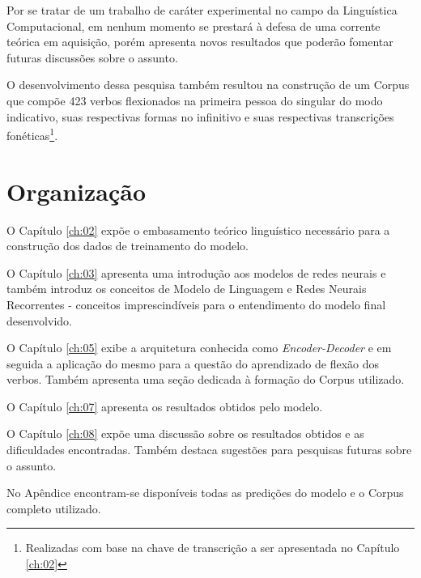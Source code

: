 Por se tratar de um trabalho de caráter experimental no campo da Linguística Computacional, em nenhum momento se prestará à defesa de uma corrente teórica em aquisição, porém apresenta novos resultados que poderão fomentar futuras discussões sobre o assunto. 

O desenvolvimento dessa pesquisa também resultou na construção de um Corpus que compõe 423 verbos flexionados na primeira pessoa do singular do modo indicativo, suas respectivas formas no infinitivo e suas respectivas transcrições fonéticas\footnote{Realizadas com base na chave de transcrição a ser apresentada no Capítulo \ref{ch:02}}.


\section{Organização}
\label{sec:organization}

O Capítulo \ref{ch:02} expõe o embasamento teórico linguístico necessário para a construção dos dados de treinamento do modelo. 

O Capítulo \ref{ch:03} apresenta uma introdução aos modelos de redes neurais e também introduz os conceitos de Modelo de Linguagem e Redes Neurais Recorrentes - conceitos imprescindíveis para o entendimento do modelo final desenvolvido.

O Capítulo \ref{ch:05} exibe a arquitetura conhecida como \textit{Encoder-Decoder} e em seguida a aplicação do mesmo para a questão do aprendizado de flexão dos verbos. Também apresenta uma seção dedicada à formação do Corpus utilizado.

O Capítulo \ref{ch:07} apresenta os resultados obtidos pelo modelo.

O Capítulo \ref{ch:08} expõe uma discussão sobre os resultados obtidos e as dificuldades encontradas. Também destaca sugestões para pesquisas futuras sobre o assunto.

No Apêndice encontram-se disponíveis todas as predições do modelo e o Corpus completo utilizado.

